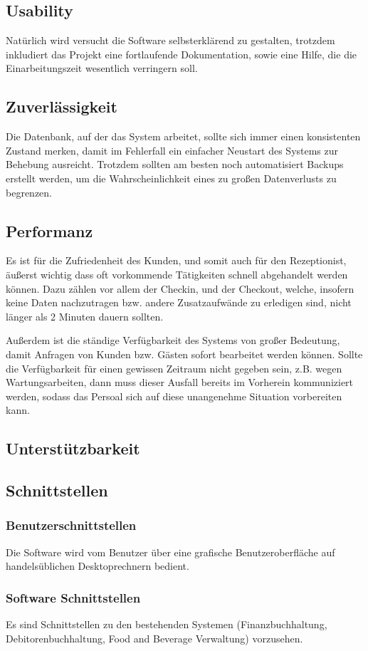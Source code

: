\documentclass[10pt,a4paper,titlepage]{article}
\begin{document}
\subsection{Usability}
Natürlich wird versucht die Software selbsterklärend zu gestalten, trotzdem inkludiert das Projekt eine fortlaufende Dokumentation, sowie eine Hilfe, die die Einarbeitungszeit wesentlich verringern soll.
\subsection{Zuverlässigkeit}
Die Datenbank, auf der das System arbeitet, sollte sich immer einen konsistenten Zustand merken, damit im Fehlerfall ein einfacher Neustart des Systems zur Behebung ausreicht. Trotzdem sollten am besten noch automatisiert Backups erstellt werden, um die Wahrscheinlichkeit eines zu großen Datenverlusts zu begrenzen.
\subsection{Performanz}
Es ist für die Zufriedenheit des Kunden, und somit auch für den \Gls{Rezeptionist}, äußerst wichtig dass oft vorkommende Tätigkeiten schnell abgehandelt werden können. Dazu zählen vor allem der \Gls{Checkin}, und der \Gls{Checkout}, welche, insofern keine Daten nachzutragen bzw. andere Zusatzaufwände zu erledigen sind, nicht länger als 2 Minuten dauern sollten.

Außerdem ist die ständige Verfügbarkeit des Systems von großer Bedeutung, damit Anfragen von Kunden bzw. Gästen sofort bearbeitet werden können. Sollte die Verfügbarkeit für einen gewissen Zeitraum nicht gegeben sein, z.B. wegen Wartungsarbeiten, dann muss dieser Ausfall bereits im Vorherein kommuniziert werden, sodass das Persoal sich auf diese unangenehme Situation vorbereiten kann.
\subsection{Unterstützbarkeit}
\subsection{Schnittstellen}
\subsubsection{Benutzerschnittstellen}
Die Software wird vom Benutzer über eine grafische Benutzeroberfläche auf handelsüblichen Desktoprechnern bedient.
\subsubsection{Software Schnittstellen}
Es sind Schnittstellen zu den bestehenden Systemen (Finanzbuchhaltung, Debitorenbuchhaltung, Food and Beverage Verwaltung) vorzusehen.
\end{document}
